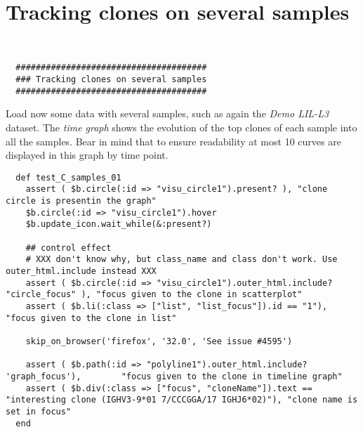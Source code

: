 

\section{Tracking clones on several samples}

\label{sec:tracking}
\begin{verbatim}


  ######################################
  ### Tracking clones on several samples
  ######################################

\end{verbatim}

Load now some data with several samples, such as again the \textit{Demo LIL-L3} dataset.
The \textit{time graph} shows the evolution of the top clones of each sample into all the samples.
Bear in mind that to ensure readability at most 10 curves are displayed in this graph by time point.

\begin{verbatim}
  def test_C_samples_01
    assert ( $b.circle(:id => "visu_circle1").present? ), "clone circle is presentin the graph"
    $b.circle(:id => "visu_circle1").hover
    $b.update_icon.wait_while(&:present?)

    ## control effect
    # XXX don't know why, but class_name and class don't work. Use outer_html.include instead XXX
    assert ( $b.circle(:id => "visu_circle1").outer_html.include? "circle_focus" ), "focus given to the clone in scatterplot"
    assert ( $b.li(:class => ["list", "list_focus"]).id == "1"),                    "focus given to the clone in list"

    skip_on_browser('firefox', '32.0', 'See issue #4595')

    assert ( $b.path(:id => "polyline1").outer_html.include? 'graph_focus'),        "focus given to the clone in timeline graph"
    assert ( $b.div(:class => ["focus", "cloneName"]).text == "interesting clone (IGHV3-9*01 7/CCCGGA/17 IGHJ6*02)"), "clone name is set in focus"
  end
\end{verbatim}

